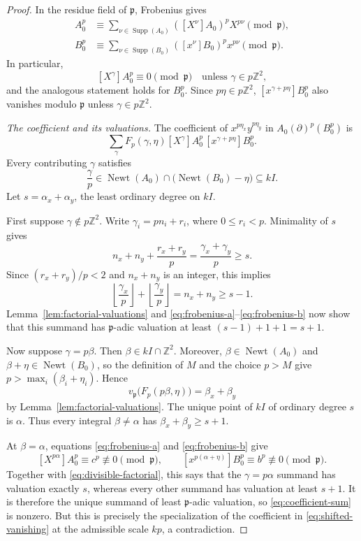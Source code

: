\documentclass[11pt]{article}
\newcommand{\Z}{\mathbb Z}
\newcommand{\Newt}{\operatorname{Newt}}
\newcommand{\Supp}{\operatorname{Supp}}
\begin{document}
\begin{proof}
In the residue field of $\mathfrak p$, Frobenius gives
\begin{align}
 A_0^p&\equiv\sum_{\nu\in\Supp(A_0)}
   ([X^\nu]A_0)^pX^{p\nu}\pmod{\mathfrak p},
 \label{eq:frobenius-a}\\
 B_0^p&\equiv\sum_{\nu\in\Supp(B_0)}
   ([x^\nu]B_0)^px^{p\nu}\pmod{\mathfrak p}.
 \label{eq:frobenius-b}
\end{align}
In particular,
\[
 [X^\gamma]A_0^p\equiv0\pmod{\mathfrak p}
 \quad\text{unless }\gamma\in p\Z^2,
\]
and the analogous statement holds for $B_0^p$.  Since $p\eta\in p\Z^2$,
$[x^{\gamma+p\eta}]B_0^p$ also vanishes modulo $\mathfrak p$ unless
$\gamma\in p\Z^2$.

\emph{The coefficient and its valuations.}
The coefficient of $x^{p\eta_x}y^{p\eta_y}$ in
$A_0(\partial)^p(B_0^p)$ is
\begin{equation}\label{eq:coefficient-sum}
 \sum_\gamma
 F_p(\gamma,\eta)
 [X^\gamma]A_0^p\,
 [x^{\gamma+p\eta}]B_0^p.
\end{equation}
Every contributing $\gamma$ satisfies
\[
 \frac{\gamma}{p}\in
 \Newt(A_0)\cap\bigl(\Newt(B_0)-\eta\bigr)\subseteq kI.
\]
Let $s=\alpha_x+\alpha_y$, the least ordinary degree on $kI$.

First suppose $\gamma\notin p\Z^2$.  Write
$\gamma_i=pn_i+r_i$, where $0\leq r_i<p$.  Minimality of $s$ gives
\[
 n_x+n_y+\frac{r_x+r_y}{p}
 =\frac{\gamma_x+\gamma_y}{p}\geq s.
\]
Since $(r_x+r_y)/p<2$ and $n_x+n_y$ is an integer, this implies
\begin{equation}\label{eq:floor-bound}
 \left\lfloor\frac{\gamma_x}{p}\right\rfloor+
 \left\lfloor\frac{\gamma_y}{p}\right\rfloor
 =n_x+n_y\geq s-1.
\end{equation}
Lemma~\ref{lem:factorial-valuations} and
\eqref{eq:frobenius-a}--\eqref{eq:frobenius-b} now show that this summand
has $\mathfrak p$-adic valuation at least $(s-1)+1+1=s+1$.

Now suppose $\gamma=p\beta$.  Then $\beta\in kI\cap\Z^2$.  Moreover,
$\beta\in\Newt(A_0)$ and $\beta+\eta\in\Newt(B_0)$, so the definition of
$M$ and the choice $p>M$ give
$p>\max_i(\beta_i+\eta_i)$.  Hence
\begin{equation}\label{eq:divisible-factorial}
 v_{\mathfrak p}\bigl(F_p(p\beta,\eta)\bigr)
 =\beta_x+\beta_y
\end{equation}
by Lemma~\ref{lem:factorial-valuations}.  The unique point of $kI$ of
ordinary degree $s$ is $\alpha$.  Thus every integral
$\beta\ne\alpha$ has $\beta_x+\beta_y\geq s+1$.

At $\beta=\alpha$, equations \eqref{eq:frobenius-a} and
\eqref{eq:frobenius-b} give
\[
 [X^{p\alpha}]A_0^p\equiv c^p\not\equiv0\pmod{\mathfrak p},
 \qquad
 [x^{p(\alpha+\eta)}]B_0^p\equiv b^p\not\equiv0
 \pmod{\mathfrak p}.
\]
Together with \eqref{eq:divisible-factorial}, this says that the
$\gamma=p\alpha$ summand has valuation exactly $s$, whereas every other
summand has valuation at least $s+1$.  It is therefore the unique summand
of least $\mathfrak p$-adic valuation, so \eqref{eq:coefficient-sum} is
nonzero.  But this is precisely the specialization of the coefficient in
\eqref{eq:shifted-vanishing} at the admissible scale $kp$, a contradiction.
\end{proof}
\end{document}
